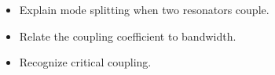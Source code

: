 \begin{objectives}
\begin{itemize}[leftmargin=1.4em,itemsep=2pt]
\item Explain mode splitting when two resonators couple.
\item Relate the coupling coefficient to bandwidth.
\item Recognize critical coupling.
\end{itemize}
\end{objectives}
